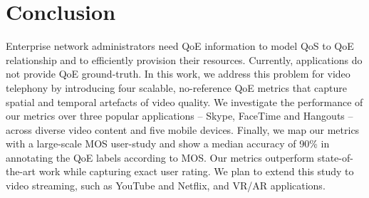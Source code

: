 \section{Conclusion}
Enterprise network administrators need QoE information to model QoS to QoE relationship and to efficiently provision their resources. Currently, applications do not provide QoE ground-truth. In this work, we address this problem for video telephony by introducing four scalable, no-reference QoE metrics that capture spatial and temporal artefacts of video quality. We investigate the performance of our metrics over three popular applications -- Skype, FaceTime and Hangouts -- across diverse video content and five mobile devices. Finally, we map our metrics with a large-scale MOS user-study and show a median accuracy of 90\% in annotating the QoE labels according to MOS. Our metrics outperform state-of-the-art work while capturing exact user rating. We plan to extend this study to video streaming, such as YouTube and Netflix, and VR/AR applications.
